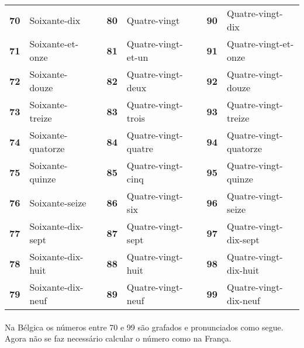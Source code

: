 \documentclass{article}
\begin{document}
\begin{center}
\begin{tabular}{r  l  c  r  l  c  r  l}
                    \textbf{70} & Soixante-dix      &   & \textbf{80} & Quatre-vingt        &   & \textbf{90} & Quatre-vingt-dix\\
                    \textbf{71} & Soixante-et-onze  &   & \textbf{81} & Quatre-vingt-et-un  &   & \textbf{91} & Quatre-vingt-et-onze\\
                    \textbf{72} & Soixante-douze    &   & \textbf{82} & Quatre-vingt-deux   &   & \textbf{92} & Quatre-vingt-douze\\
                    \textbf{73} & Soixante-treize   &   & \textbf{83} & Quatre-vingt-trois  &   & \textbf{93} & Quatre-vingt-treize\\
                    \textbf{74} & Soixante-quatorze &   & \textbf{84} & Quatre-vingt-quatre &   & \textbf{94} & Quatre-vingt-quatorze\\
                    \textbf{75} & Soixante-quinze   &   & \textbf{85} & Quatre-vingt-cinq   &   & \textbf{95} & Quatre-vingt-quinze\\
                    \textbf{76} & Soixante-seize    &   & \textbf{86} & Quatre-vingt-six    &   & \textbf{96} & Quatre-vingt-seize\\
                    \textbf{77} & Soixante-dix-sept &   & \textbf{87} & Quatre-vingt-sept   &   & \textbf{97} & Quatre-vingt-dix-sept\\
                    \textbf{78} & Soixante-dix-huit &   & \textbf{88} & Quatre-vingt-huit   &   & \textbf{98} & Quatre-vingt-dix-huit\\
                    \textbf{79} & Soixante-dix-neuf &   & \textbf{89} & Quatre-vingt-neuf   &   & \textbf{99} & Quatre-vingt-dix-neuf\\
                \end{tabular}
            \end{center}                 
            
        \paragraph{}Na Bélgica os números entre 70 e 99 são grafados e pronunciados como segue. Agora não se faz necessário calcular o número como na França.
            
\end{document}
